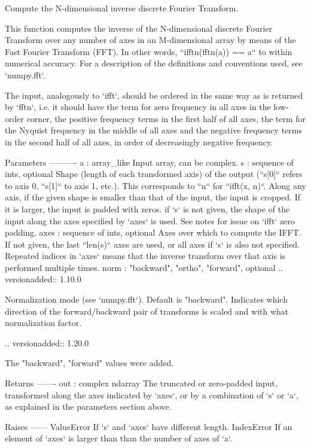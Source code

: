 \begin{DoxyVerb}Compute the N-dimensional inverse discrete Fourier Transform.

This function computes the inverse of the N-dimensional discrete
Fourier Transform over any number of axes in an M-dimensional array by
means of the Fast Fourier Transform (FFT).  In other words,
``ifftn(fftn(a)) == a`` to within numerical accuracy.
For a description of the definitions and conventions used, see `numpy.fft`.

The input, analogously to `ifft`, should be ordered in the same way as is
returned by `fftn`, i.e. it should have the term for zero frequency
in all axes in the low-order corner, the positive frequency terms in the
first half of all axes, the term for the Nyquist frequency in the middle
of all axes and the negative frequency terms in the second half of all
axes, in order of decreasingly negative frequency.

Parameters
----------
a : array_like
    Input array, can be complex.
s : sequence of ints, optional
    Shape (length of each transformed axis) of the output
    (``s[0]`` refers to axis 0, ``s[1]`` to axis 1, etc.).
    This corresponds to ``n`` for ``ifft(x, n)``.
    Along any axis, if the given shape is smaller than that of the input,
    the input is cropped.  If it is larger, the input is padded with zeros.
    if `s` is not given, the shape of the input along the axes specified
    by `axes` is used.  See notes for issue on `ifft` zero padding.
axes : sequence of ints, optional
    Axes over which to compute the IFFT.  If not given, the last ``len(s)``
    axes are used, or all axes if `s` is also not specified.
    Repeated indices in `axes` means that the inverse transform over that
    axis is performed multiple times.
norm : {"backward", "ortho", "forward"}, optional
    .. versionadded:: 1.10.0

    Normalization mode (see `numpy.fft`). Default is "backward".
    Indicates which direction of the forward/backward pair of transforms
    is scaled and with what normalization factor.

    .. versionadded:: 1.20.0

        The "backward", "forward" values were added.

Returns
-------
out : complex ndarray
    The truncated or zero-padded input, transformed along the axes
    indicated by `axes`, or by a combination of `s` or `a`,
    as explained in the parameters section above.

Raises
------
ValueError
    If `s` and `axes` have different length.
IndexError
    If an element of `axes` is larger than than the number of axes of `a`.


\end{DoxyVerb}
